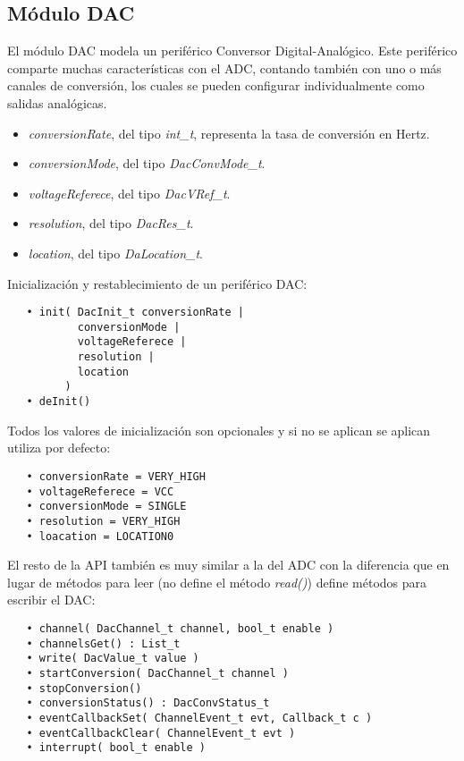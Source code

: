 \subsection{Módulo DAC}

El módulo DAC modela un periférico Conversor Digital-Analógico. Este periférico comparte muchas características con el ADC, contando también con uno o más canales de conversión, los cuales se pueden configurar individualmente como salidas analógicas.


\begin{itemize}
\item
\emph{conversionRate}, del tipo \emph{int\_t}, representa la tasa de conversión en Hertz.
\item
\emph{conversionMode}, del tipo \emph{DacConvMode\_t}.
\item
\emph{voltageReferece}, del tipo \emph{DacVRef\_t}.
\item
\emph{resolution}, del tipo \emph{DacRes\_t}.
\item
\emph{location}, del tipo \emph{DaLocation\_t}.
\end{itemize}


Inicialización y restablecimiento de un periférico DAC:

\begin{verbatim}
   • init( DacInit_t conversionRate | 
           conversionMode | 
           voltageReferece | 
           resolution |
           location
         )
   • deInit()
\end{verbatim}

Todos los valores de inicialización son opcionales y si no se aplican se aplican utiliza por defecto:

\begin{verbatim}
   • conversionRate = VERY_HIGH
   • voltageReferece = VCC
   • conversionMode = SINGLE
   • resolution = VERY_HIGH
   • loacation = LOCATION0
\end{verbatim}

El resto de la API también es muy similar a la del ADC con la diferencia que en lugar de métodos para leer (no define el método \emph{read()}) define métodos para escribir el DAC:

\begin{verbatim}
   • channel( DacChannel_t channel, bool_t enable )
   • channelsGet() : List_t
   • write( DacValue_t value )
   • startConversion( DacChannel_t channel )
   • stopConversion()
   • conversionStatus() : DacConvStatus_t
   • eventCallbackSet( ChannelEvent_t evt, Callback_t c )
   • eventCallbackClear( ChannelEvent_t evt )
   • interrupt( bool_t enable )
\end{verbatim}

